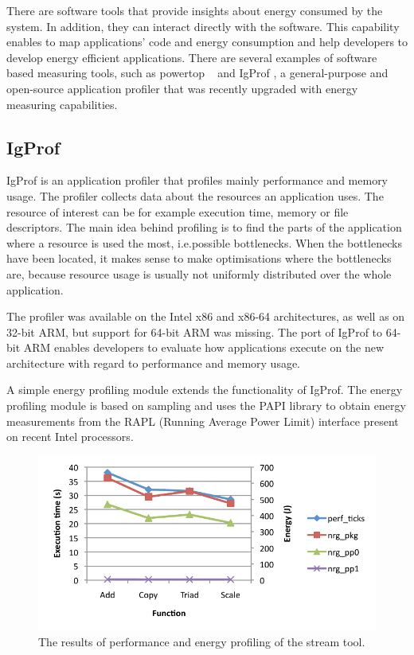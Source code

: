 \documentclass[a4paper]{jpconf}
\begin{document}
There are software tools that provide insights about energy consumed by the
system. In addition, they can interact directly with the software. This
capability enables to map applications' code and energy consumption and help
developers to develop energy efficient applications. There are several examples
of software based measuring tools, such as powertop ~\cite{POWERTOP} and IgProf
\cite{igprof-web}, a general-purpose and open-source application profiler that 
was recently upgraded with energy measuring capabilities.

\subsection{IgProf}
IgProf is an application profiler that profiles mainly performance and memory usage. The profiler collects data about the resources an application uses. The resource of interest can be for example execution time, memory or file descriptors. The main idea behind profiling is to find the parts of the application where a resource is used the most, i.e.\@ possible bottlenecks. When the bottlenecks have been located, it makes sense to make optimisations where the bottlenecks are, because resource usage is usually not uniformly distributed over the whole application. \cite{igprof-web} \cite{tuura08} \cite{fowler02}

The profiler was available on the Intel x86 and x86-64 architectures, as well as on 32-bit ARM, but support for 64-bit ARM was missing. The port of IgProf to 64-bit ARM enables developers to evaluate how applications execute on the new architecture with regard to performance and memory usage.

A simple energy profiling module extends the functionality of IgProf. The energy profiling module is based on sampling and uses the PAPI library to obtain energy measurements from the RAPL (Running Average Power Limit) interface present on recent Intel processors. \cite{weaver12}

\begin{figure}[htb]
  \begin{center}
    \includegraphics{img/stream-pp-np.pdf}
  \end{center}
  \vspace{-20pt}
  \caption{The results of performance and energy profiling of the stream tool.}
  \label{fig:stream-pp-np} 
\end{figure}
\end{document}
